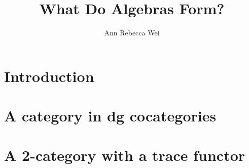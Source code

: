 \documentclass[12pt]{nuthesis} %
\author{Ann Rebecca Wei}
\title{What Do Algebras Form?}
\theoremstyle{definition}
\theoremstyle{remark}
\theoremstyle{example}
\begin{document}

\frontmatter		%
\maketitle		%

\abstract		%


\acknowledgements	%





\nomenclature %


%
%
\clearpage{} %
\tableofcontents	%

\clearpage{} %
\listoftables		%

\listoffigures		%



\mainmatter             %

\chapter{Introduction}
	

\chapter{A category in dg cocategories} \label{chap:cat_in_dgcocats}
	
	
	

\chapter{A 2-category with a trace functor} \label{chap:2cat_trace}
	
	
	
\end{document}

